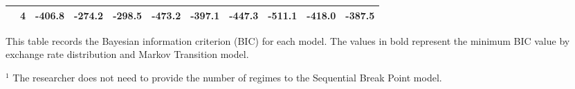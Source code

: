 \begin{landscape}
\begin{table}
\begin{threeparttable}
\begin{tabular}[c]{l c r r r | r r r | r r r}
						& 4 &           -406.8 &  -274.2 &  -298.5 &           -473.2 &  -397.1 &  -447.3 &   \textbf{-511.1} &  -418.0 &   -387.5  \\
			\hline
		\end{tabular}
		\begin{tablenotes}
			\item{This table records the Bayesian information criterion (BIC) for each model. The values in bold represent the minimum BIC value by exchange rate distribution and Markov Transition model.}
			\item{$^{1}$ The researcher does not need to provide the number of regimes to the Sequential Break Point model.}
		\end{tablenotes}
	\end{threeparttable}
\end{table}



\end{landscape}
